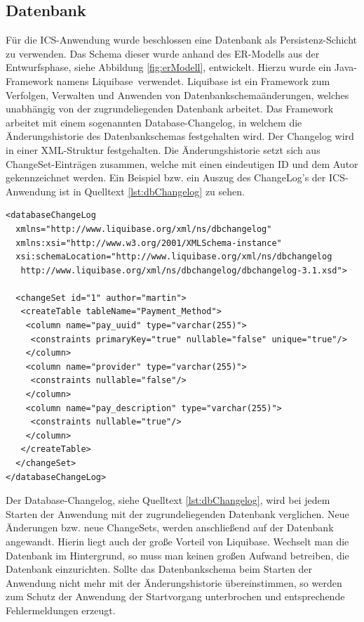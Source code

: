 	\subsection{Datenbank} \label{umsetzung:backend:datenbank}
	Für die \ac{ICS}-Anwendung wurde beschlossen eine Datenbank als Persistenz-Schicht zu verwenden. Das Schema dieser wurde anhand des ER-Modells aus der Entwurfsphase, siehe Abbildung \ref{fig:erModell}, entwickelt. Hierzu wurde ein Java-Framework namens \glqq Liquibase\grqq \, verwendet.\autocite{Liquibase} Liquibase ist ein Framework zum Verfolgen, Verwalten und Anwenden von Datenbankschemaänderungen, welches unabhängig von der zugrundeliegenden Datenbank arbeitet. Das Framework arbeitet mit einem sogenannten \glqq Database-Changelog\grqq, in welchem die Änderungshistorie des Datenbankschemas festgehalten wird. Der Changelog wird in einer XML-Struktur festgehalten. Die Änderungshistorie setzt sich aus \glqq ChangeSet\grqq-Einträgen zusammen, welche mit einen eindeutigen \ac{ID} und dem Autor gekennzeichnet werden. Ein Beispiel bzw. ein Auszug des ChangeLog's der \ac{ICS}-Anwendung ist in Quelltext \ref{lst:dbChangelog} zu sehen.
	
\begin{lstlisting}[caption={Database-Changelog Liquibase}, label={lst:dbChangelog}, basicstyle=\ttfamily\fontsize{10}{12}\selectfont]
<databaseChangeLog
  xmlns="http://www.liquibase.org/xml/ns/dbchangelog"
  xmlns:xsi="http://www.w3.org/2001/XMLSchema-instance"
  xsi:schemaLocation="http://www.liquibase.org/xml/ns/dbchangelog   
   http://www.liquibase.org/xml/ns/dbchangelog/dbchangelog-3.1.xsd">
  
  <changeSet id="1" author="martin">
   <createTable tableName="Payment_Method">
    <column name="pay_uuid" type="varchar(255)">
     <constraints primaryKey="true" nullable="false" unique="true"/>
    </column>
    <column name="provider" type="varchar(255)">
     <constraints nullable="false"/>
    </column>
    <column name="pay_description" type="varchar(255)">
     <constraints nullable="true"/>
    </column>
   </createTable>
  </changeSet>
</databaseChangeLog>
\end{lstlisting}

	Der Database-Changelog, siehe Quelltext \ref{lst:dbChangelog}, wird bei jedem Starten der Anwendung mit der zugrundeliegenden Datenbank verglichen. Neue Änderungen bzw. neue ChangeSets, werden anschließend auf der Datenbank angewandt. Hierin liegt auch der große Vorteil von Liquibase. Wechselt man die Datenbank im Hintergrund, so muss man keinen großen Aufwand betreiben, die Datenbank einzurichten. Sollte das Datenbankschema beim Starten der Anwendung nicht mehr mit der Änderungshistorie übereinstimmen, so werden zum Schutz der Anwendung der Startvorgang unterbrochen und entsprechende Fehlermeldungen erzeugt.
	
